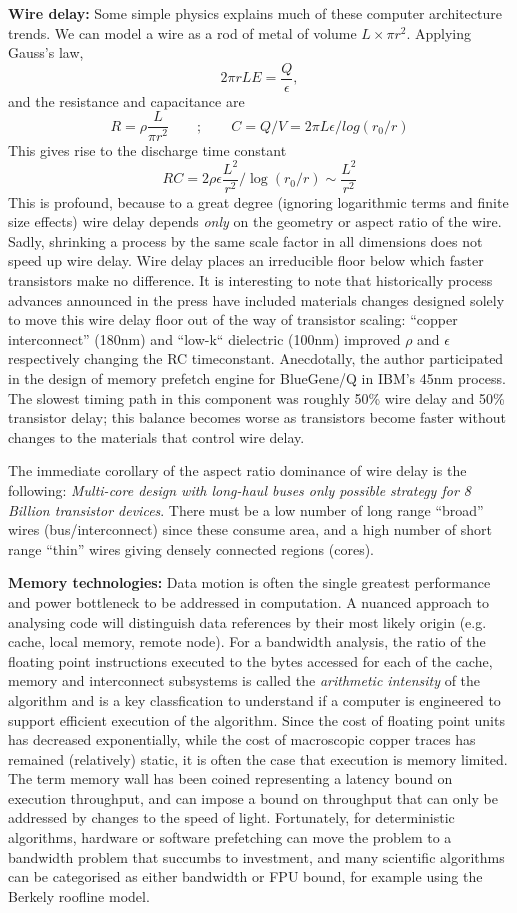 \documentclass{PoS}
\begin{document}
{\bf Wire delay:}
Some simple physics explains much of these computer architecture trends. We can model a wire as a rod of metal of volume
$L \times \pi r^2$. Applying Gauss's law,
$$
2\pi r L E = \frac{Q}{\epsilon},
$$
and the resistance and capacitance are
$$
R = \rho \frac{L}{\pi r^2} \quad\quad;\quad\quad
C = Q/V = 2\pi L \epsilon / log(r_0/r)
$$
This gives rise to the discharge time constant
$$
RC = 2 \rho \epsilon \frac{L^2}{r^2} / \log(r_0/r) \sim \frac{L^2}{r^2}
$$
This is profound, because to a great degree (ignoring logarithmic terms and finite size effects)
wire delay depends \emph{only} on the geometry or aspect ratio of the wire. Sadly, shrinking 
a process by the same scale factor in all dimensions does not speed up wire delay. Wire delay places
an irreducible floor below which faster transistors make no difference. It is interesting to note
that historically process advances announced in the press have included materials changes designed
solely to move this wire delay floor out of the way of transistor scaling:
``copper interconnect'' (180nm) and ``low-k`` dielectric (100nm) improved $\rho$ and $\epsilon$ respectively
changing the RC timeconstant. Anecdotally, the author participated in the design of memory prefetch engine
for BlueGene/Q in IBM's 45nm process. The slowest timing path in this component was roughly 50\% wire delay
and 50\% transistor delay; this balance becomes worse as transistors become faster without changes to the
materials that control wire delay.

The immediate corollary of the aspect ratio dominance of wire delay is the following:
\emph{Multi-core design with long-haul buses only possible strategy for 8 Billion transistor devices}.
There must be a low number of long range ``broad'' wires (bus/interconnect) since these consume area,
and a high number of short range ``thin'' wires giving densely connected regions (cores).

{\bf Memory technologies:}
Data motion is often the single greatest performance and power 
bottleneck to be addressed in computation. A nuanced approach to analysing code
will distinguish data references by their most likely origin (e.g. cache, local memory, remote node).
For a bandwidth analysis, the ratio of the floating point instructions executed to the bytes accessed 
for each of the cache, memory and interconnect subsystems is called the \emph{arithmetic intensity} of the
algorithm and is a key classfication to understand if a computer is engineered to support efficient execution
of the algorithm.
Since the cost of floating point units has decreased exponentially, while the cost of macroscopic
copper traces has remained (relatively) static, it is often the case that execution is memory limited.
The term memory wall has been coined representing a latency bound on execution throughput\cite{mwall},
and can impose a bound on throughput that can only be addressed by changes to the speed of light. Fortunately,
for deterministic algorithms, hardware or software prefetching can move the problem to a bandwidth problem
that succumbs to investment, and many scientific algorithms can be categorised as either bandwidth or FPU
bound, for example using the Berkely roofline model\cite{roofline}.
\end{document}
